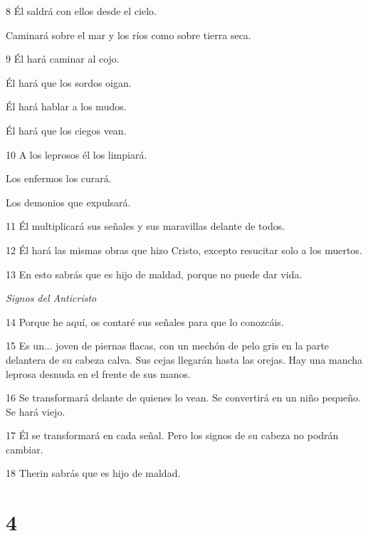 \par 8 Él saldrá con ellos desde el cielo.

Caminará sobre el mar y los ríos como sobre tierra seca.

\par 9 Él hará caminar al cojo.

\par Él hará que los sordos oigan.

\par Él hará hablar a los mudos.

\par Él hará que los ciegos vean.

\par 10 A los leprosos él los limpiará.

\par Los enfermos los curará.

\par Los demonios que expulsará.

\par 11 Él multiplicará sus señales y sus maravillas delante de todos.

\par 12 Él hará las mismas obras que hizo Cristo, excepto resucitar solo a los muertos.

\par 13 En esto sabrás que es hijo de maldad, porque no puede dar vida.

\par \textit{Signos del Anticristo}

\par 14 Porque he aquí, os contaré sus señales para que lo conozcáis.

\par 15 Es un... joven de piernas flacas, con un mechón de pelo gris en la parte delantera de su cabeza calva. Sus cejas llegarán hasta las orejas. Hay una mancha leprosa desnuda en el frente de sus manos.

\par 16 Se transformará delante de quienes lo vean. Se convertirá en un niño pequeño. Se hará viejo.

\par 17 Él se transformará en cada señal. Pero los signos de su cabeza no podrán cambiar.

\par 18 Therin sabrás que es hijo de maldad.

\chapter{4}

